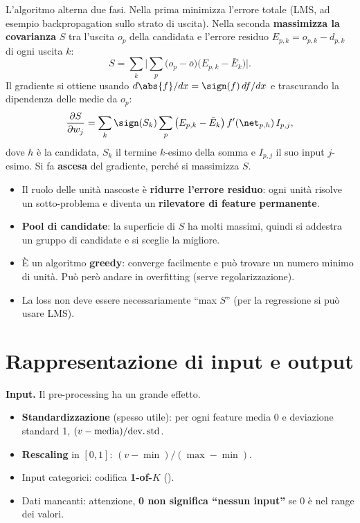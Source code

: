 L'algoritmo alterna due fasi. Nella prima minimizza l'errore totale (LMS, ad esempio backpropagation sullo strato
di uscita). Nella seconda \textbf{massimizza la covarianza} $S$ tra l'uscita $o_p$ della candidata e l'errore
residuo $E_{p,k} = o_{p,k}-d_{p,k}$ di ogni uscita $k$:
\[
S = \sum_k\Big\lvert\sum_p\big(o_p-\bar o\big)\big(E_{p,k}-\bar E_k\big)\Big\rvert .
\]
Il gradiente si ottiene usando $d\abs{f}/dx = \sign(f)\,df/dx$ e trascurando la dipendenza delle medie da $o_p$:
\[
\frac{\partial S}{\partial w_j} = \sum_k\sign(S_k)\sum_p\big(E_{p,k}-\bar E_k\big)\,f'(\net_{p,h})\,I_{p,j},
\]
dove $h$ è la candidata, $S_k$ il termine $k$-esimo della somma e $I_{p,j}$ il suo input $j$-esimo. Si fa
\textbf{ascesa} del gradiente, perché si massimizza $S$.
\begin{itemize}
  \item Il ruolo delle unità nascoste è \textbf{ridurre l'errore residuo}: ogni unità risolve un sotto-problema e
        diventa un \textbf{rilevatore di feature permanente}.
  \item \textbf{Pool di candidate}: la superficie di $S$ ha molti massimi, quindi si addestra un gruppo di
        candidate e si sceglie la migliore.
  \item È un algoritmo \textbf{greedy}: converge facilmente e può trovare un numero minimo di unità. Può però
        andare in overfitting (serve regolarizzazione).
  \item La loss non deve essere necessariamente ``max $S$'' (per la regressione si può usare LMS).
\end{itemize}

\section{Rappresentazione di input e output}
\label{sec:input-output}

\textbf{Input.} Il pre-processing ha un grande effetto.
\begin{itemize}
  \item \textbf{Standardizzazione} (spesso utile): per ogni feature media 0 e deviazione standard 1,
        $(v-\text{media})/\text{dev.\,std}$.
  \item \textbf{Rescaling} in $[0,1]$: $(v-\min)/(\max-\min)$.
  \item Input categorici: codifica \textbf{1-of-$K$} ().
  \item Dati mancanti: attenzione, \textbf{0 non significa ``nessun input''} se 0 è nel range dei valori.
\end{itemize}

